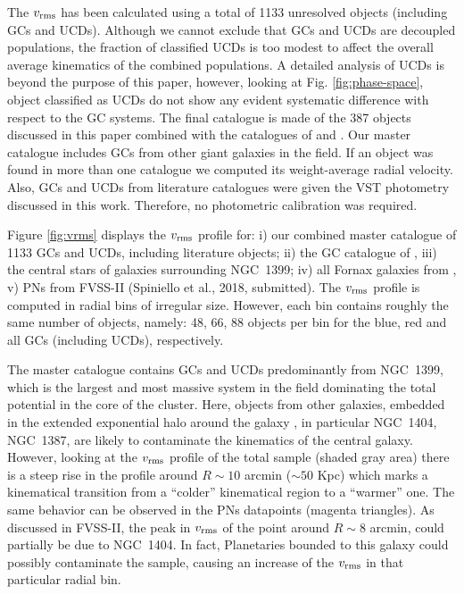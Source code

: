 \documentclass[usenatbib]{mnras}
\begin{document}
The $v_{\rm rms}$ has been calculated using a total of 1133 unresolved objects 
(including GCs and UCDs). Although we cannot exclude that GCs and UCDs are 
decoupled populations, 
the fraction of classified UCDs is too modest to affect the overall average 
kinematics of the combined populations. A detailed analysis of UCDs is beyond 
the purpose of this paper,
however, looking at Fig. \ref{fig:phase-space}, object classified as UCDs do 
not show any evident systematic difference with respect to the GC systems. 
The final catalogue is made of the 387 objects discussed in this paper 
combined with the catalogues of \citet{Bergond07} and \citet{Schuberth}. Our master catalogue
includes GCs from other giant galaxies in the field. If an 
object was found in more than one catalogue we computed its weight-average radial 
velocity. Also, GCs and UCDs from 
literature catalogues were given the VST photometry discussed in this work. 
Therefore, no photometric calibration was required.

Figure \ref{fig:vrms} displays the $v_{\rm rms}$ profile for: i) our combined master 
catalogue of 1133 GCs and UCDs, including literature objects; ii) the GC catalogue of 
\citet{Schuberth}, iii) the central stars of galaxies surrounding NGC~1399; iv) 
all Fornax galaxies from \citet{Drinkwater00}, v) PNs from FVSS-II (Spiniello et al., 2018, submitted).
The $v_{\rm rms}$ profile is computed in radial bins of irregular 
size. However, each bin contains roughly the same number of objects, namely: 
48, 66, 88 objects per bin for the blue, red and all GCs (including UCDs), respectively. 

The master catalogue contains GCs and UCDs predominantly from NGC~1399, which 
is the largest and most massive system in the field dominating the total 
potential in the core of the cluster. Here, objects from other galaxies, 
embedded in the extended exponential halo around the galaxy \citep{Iodice16}, 
in particular NGC~1404, NGC~1387, are likely to contaminate the 
kinematics of the central galaxy. However, looking at the $v_{\rm rms}$ 
profile of the total sample (shaded gray area) there is a steep rise in the 
profile around $R\sim10$ arcmin ($\sim 50$ Kpc) which marks a kinematical transition from a 
``colder'' kinematical region to a ``warmer'' one. 
The same behavior can be observed in the PNs datapoints 
(magenta triangles). As discussed in FVSS-II, the peak in $v_{\rm rms}$ 
of the point around $R\sim 8$ arcmin, could partially be due to NGC~1404. 
In fact, Planetaries bounded to this galaxy could possibly contaminate the sample, 
causing an increase of the $v_{\rm rms}$ in that particular radial bin.
\end{document}
